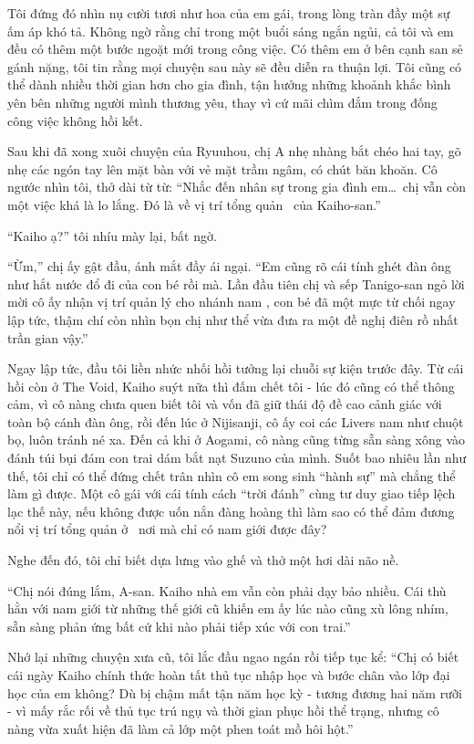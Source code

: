 \documentclass[../main.tex]{subfiles}
\begin{document}
Tôi đứng đó nhìn nụ cười tươi như hoa của em gái, trong lòng tràn đầy một sự ấm áp khó tả. Không ngờ rằng chỉ trong một buổi sáng ngắn ngủi, cả tôi và em đều có thêm một bước ngoặt mới trong công việc. Có thêm em ở bên cạnh san sẻ gánh nặng, tôi tin rằng mọi chuyện sau này sẽ đều diễn ra thuận lợi. Tôi cũng có thể dành nhiều thời gian hơn cho gia đình, tận hưởng những khoảnh khắc bình yên bên những người mình thương yêu, thay vì cứ mãi chìm đắm trong đống công việc không hồi kết.

\ct

Sau khi đã xong xuôi chuyện của Ryuuhou, chị A nhẹ nhàng bắt chéo hai tay, gõ nhẹ các ngón tay lên mặt bàn với vẻ mặt trầm ngâm, có chút băn khoăn. Cô ngước nhìn tôi, thở dài từ từ: ``Nhắc đến nhân sự trong gia đình em\dots\ chị vẫn còn một việc khá là lo lắng. Đó là về vị trí tổng quản \hls\ của Kaiho-san.''

``Kaiho ạ?'' tôi nhíu mày lại, bất ngờ.

``Ừm,'' chị ấy gật đầu, ánh mắt đầy ái ngại. ``Em cũng rõ cái tính ghét đàn ông như hắt nước đổ đi của con bé rồi mà. Lần đầu tiên chị và sếp Tanigo-san ngỏ lời mời cô ấy nhận vị trí quản lý cho nhánh nam \hls, con bé đã một mực từ chối ngay lập tức, thậm chí còn nhìn bọn chị như thể vừa đưa ra một đề nghị điên rồ nhất trần gian vậy.''

Ngay lập tức, đầu tôi liền nhức nhối hồi tưởng lại chuỗi sự kiện trước đây. Từ cái hồi còn ở The Void, Kaiho suýt nữa thì đấm chết tôi  - lúc đó cũng có thể thông cảm, vì cô nàng chưa quen biết tôi và vốn đã giữ thái độ đề cao cảnh giác với toàn bộ cánh đàn ông, rồi đến lúc ở Nijisanji, cô ấy coi các Livers nam như chuột bọ, luôn tránh né xa. Đến cả khi ở Aogami, cô nàng cũng từng sẵn sàng xông vào đánh túi bụi đám con trai dám bắt nạt Suzuno của mình. Suốt bao nhiêu lần như thế, tôi chỉ có thể đứng chết trân nhìn cô em song sinh ``hành sự'' mà chẳng thể làm gì được. Một cô gái với cái tính cách ``trời đánh'' cùng tư duy giao tiếp lệch lạc thế này, nếu không được uốn nắn đàng hoàng thì làm sao có thể đảm đương nổi vị trí tổng quản ở \hls\ nơi mà chỉ có nam giới được đây?

Nghe đến đó, tôi chỉ biết dựa lưng vào ghế và thở một hơi dài não nề.

``Chị nói đúng lắm, A-san. Kaiho nhà em vẫn còn phải dạy bảo nhiều. Cái thù hằn với nam giới từ những thế giới cũ khiến em ấy lúc nào cũng xù lông nhím, sẵn sàng phản ứng bất cứ khi nào phải tiếp xúc với con trai.''

Nhớ lại những chuyện xưa cũ, tôi lắc đầu ngao ngán rồi tiếp tục kể: ``Chị có biết cái ngày Kaiho chính thức hoàn tất thủ tục nhập học và bước chân vào lớp đại học của em không? Dù bị chậm mất tận năm học kỳ - tương đương hai năm rưỡi - vì mấy rắc rối về thủ tục trú ngụ và thời gian phục hồi thể trạng, nhưng cô nàng vừa xuất hiện đã làm cả lớp một phen toát mồ hôi hột.''
\end{document}
